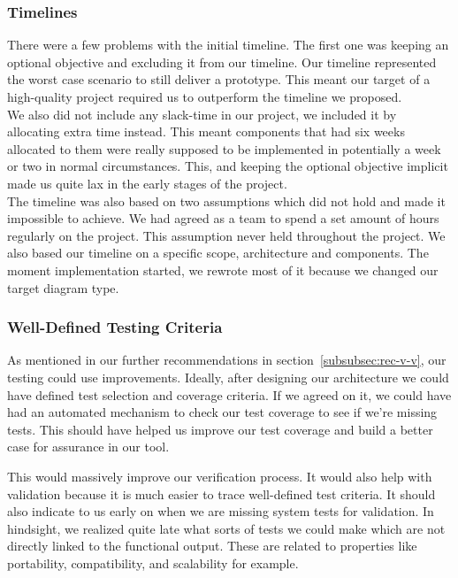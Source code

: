\subsubsection{Timelines}
There were a few problems with the initial timeline.
The first one was keeping an optional objective and excluding it from our timeline.
Our timeline represented the worst case scenario to still deliver a prototype.
This meant our target of a high-quality project required us to outperform the timeline we proposed.\\

We also did not include any slack-time in our project, we included it by allocating extra time instead.
This meant components that had six weeks allocated
to them were really supposed to be implemented in potentially a week or two in normal circumstances.
This, and keeping the optional objective implicit made us quite lax in the early stages of the project.\\

The timeline was also based on two assumptions which did not hold and made it impossible to achieve.
We had agreed as a team to spend a set amount of hours regularly on the project.
This assumption never held throughout the project.
We also based our timeline on a specific scope, architecture and components.
The moment implementation started, we rewrote most of it because we changed our target diagram type.

\subsubsection{Well-Defined Testing Criteria}
As mentioned in our further recommendations in section~\ref{subsubsec:rec-v-v}, our testing could use improvements.
Ideally, after designing our architecture we could have defined test selection and coverage criteria.
If we agreed on it, we could have had an automated mechanism to check our test coverage to see if we're missing tests.
This should have helped us improve our test coverage and build a better case for assurance in our tool.

This would massively improve our verification process.
It would also help with validation because it is much easier to trace well-defined test criteria.
It should also indicate to us early on when we are missing system tests for validation.
In hindsight, we realized quite late what sorts of tests we could make which are not directly linked to the functional output.
These are related to properties like portability, compatibility, and scalability for example.